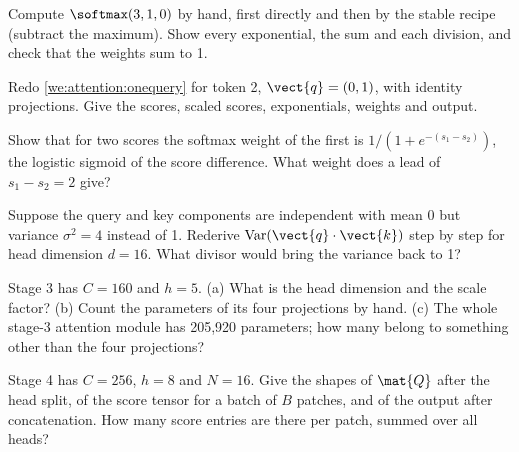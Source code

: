 \begin{checkyourself}
\item\label{ex:attention:1} Compute $\softmax(3, 1, 0)$ by hand, first directly and then by the
stable recipe (subtract the maximum). Show every exponential, the sum and each division, and check
that the weights sum to 1.
\item\label{ex:attention:2} Redo \cref{we:attention:onequery} for token 2, $\vect{q} = (0, 1)$,
with identity projections. Give the scores, scaled scores, exponentials, weights and output.
\item\label{ex:attention:3} Show that for two scores the softmax weight of the first is
$1/(1 + e^{-(s_1 - s_2)})$, the logistic sigmoid of the score difference. What weight does a lead
of $s_1 - s_2 = 2$ give?
\item\label{ex:attention:4} Suppose the query and key components are independent with mean 0 but
variance $\sigma^2 = 4$ instead of 1. Rederive $\operatorname{Var}(\vect{q}\cdot\vect{k})$ step by
step for head dimension $d = 16$. What divisor would bring the variance back to 1?
\item\label{ex:attention:5} Stage 3 has $C = 160$ and $h = 5$. (a) What is the head dimension and
the scale factor? (b) Count the parameters of its four projections by hand. (c) The whole stage-3
attention module has 205{,}920 parameters; how many belong to something other than the four
projections?
\item\label{ex:attention:6} Stage 4 has $C = 256$, $h = 8$ and $N = 16$. Give the shapes of
$\mat{Q}$ after the head split, of the score tensor for a batch of $B$ patches, and of the output
after concatenation. How many score entries are there per patch, summed over all heads?
\end{checkyourself}

